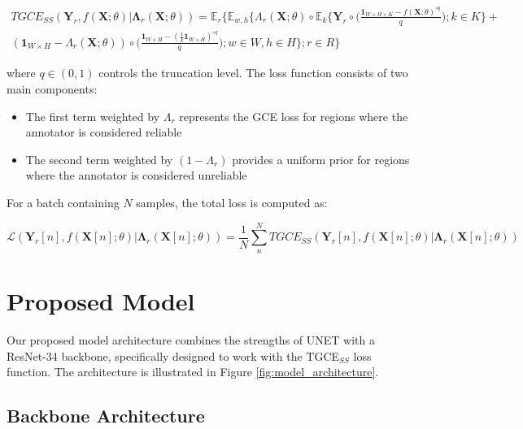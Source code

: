 \begin{equation}
  \begin{split}
    TGCE_{SS}(\mathbf{Y}_r,f(\mathbf X;\theta) | \mathbf{\Lambda}_r
    (\mathbf X;\theta)) = \mathbb E_{r} \Bigg\{ \mathbb E_{w,h}
      \Bigg\{ \Lambda_r (\mathbf X; \theta) \circ \mathbb E_k \bigg\{
          \mathbf Y_r \circ \bigg( \frac{\mathbf 1 _{W\times H \times
        K} - f(\mathbf X;\theta) ^{\circ q }}{q} \bigg); k \in K  \bigg\}  + \\
        \left(\mathbf 1 _{W \times H } - \Lambda _r (\mathbf
        X;\theta)\right) \circ \bigg(   \frac{\mathbf 1_{W\times H} -
        (\frac {1}{k} \mathbf 1_{W\times H})^{\circ q}}{q} \bigg); w \in
    W, h \in H \Bigg\};r\in R\Bigg\}
  \end{split}
\end{equation}

where $q \in (0,1)$ controls the truncation level. The loss function
consists of two main components:

\begin{itemize}
  \item The first term weighted by $\Lambda_r$ represents the GCE
    loss for regions where the annotator is considered reliable
  \item The second term weighted by $(1-\Lambda_r)$ provides a
    uniform prior for regions where the annotator is considered unreliable
\end{itemize}

For a batch containing $N$ samples, the total loss is computed as:

\begin{equation}
  \mathscr{L}\left(\mathbf{Y}_r[n],f(\mathbf X[n];\theta) |
  \mathbf{\Lambda}_r (\mathbf X[n];\theta)\right)  = \frac{1}{N}
  \sum_{n}^NTGCE_{SS}(\mathbf{Y}_r[n],f(\mathbf X[n];\theta) |
  \mathbf{\Lambda}_r (\mathbf X[n];\theta))
\end{equation}

\section{Proposed Model}

Our proposed model architecture combines the strengths of UNET with a
ResNet-34 backbone, specifically designed to work with the
TGCE$_{SS}$ loss function. The architecture is illustrated in Figure
\ref{fig:model_architecture}.

\subsection{Backbone Architecture}

